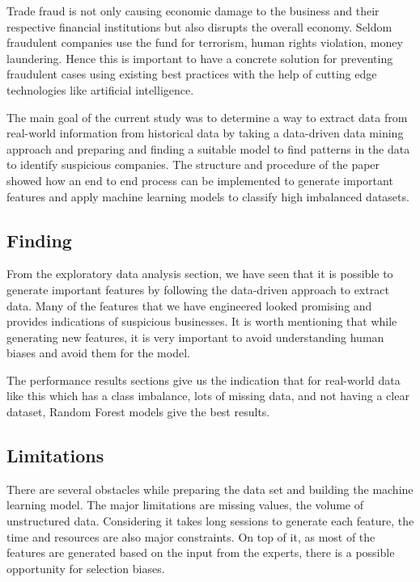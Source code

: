 Trade fraud is not only causing economic damage to the business and their respective financial institutions but also disrupts the overall economy. Seldom fraudulent companies use the fund for terrorism, human rights violation, money laundering. Hence this is important to have a concrete solution for preventing fraudulent cases using existing best practices with the help of cutting edge technologies like artificial intelligence. 

The main goal of the current study was to determine a way to extract data from real-world information from historical data by taking a data-driven data mining approach and preparing and finding a suitable model to find patterns in the data to identify suspicious companies. The structure and procedure of the paper showed how an end to end process can be implemented to generate important features and apply machine learning models to classify high imbalanced datasets. 

\subsection{Finding}
From the exploratory data analysis section, we have seen that it is possible to generate important features by following the data-driven approach to extract data. Many of the features that we have engineered looked promising and provides indications of suspicious businesses. It is worth mentioning that while generating new features, it is very important to avoid understanding human biases and avoid them for the model. 

The performance results sections give us the indication that for real-world data like this which has a class imbalance, lots of missing data, and not having a clear dataset, Random Forest models give the best results. 

\subsection{Limitations}
There are several obstacles while preparing the data set and building the machine learning model. The major limitations are missing values, the volume of unstructured data. Considering it takes long sessions to generate each feature, the time and resources are also major constraints. On top of it, as most of the features are generated based on the input from the experts, there is a possible opportunity for selection biases. 



